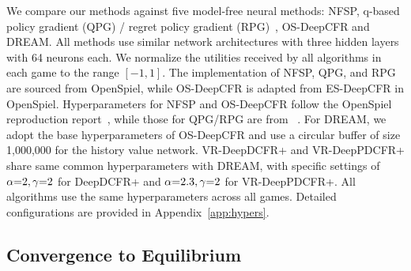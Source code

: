 \documentclass[letterpaper]{article} %
\begin{document}
We compare our methods against five model-free neural methods: NFSP, q-based policy gradient (QPG) / regret policy gradient (RPG)~\cite{srinivasan2018actor}, OS-DeepCFR and DREAM. All methods use similar network architectures with three hidden layers with 64 neurons each. 
We normalize the utilities received by all algorithms in each game to the range $[-1, 1]$.
The implementation of NFSP, QPG, and RPG are sourced from OpenSpiel, while OS-DeepCFR is adapted from ES-DeepCFR in OpenSpiel.
Hyperparameters for NFSP and OS-DeepCFR follow the OpenSpiel reproduction report~\cite{walton2021multi}, while those for QPG/RPG are from ~\cite{farina2021model}. For DREAM, we adopt the     base hyperparameters of OS-DeepCFR and use a circular buffer of size 1,000,000 for the history value network. VR-DeepDCFR+ and VR-DeepPDCFR+ share same common hyperparameters with DREAM, with specific settings of $\alpha\small{=}2, \gamma\small{=}2$ for DeepDCFR+ and $\alpha\small{=}2.3, \gamma\small{=}2$ for VR-DeepPDCFR+. All algorithms use the same hyperparameters across all games. Detailed configurations are provided in Appendix~\ref{app:hypers}.


\subsection{Convergence to Equilibrium}
\end{document}
